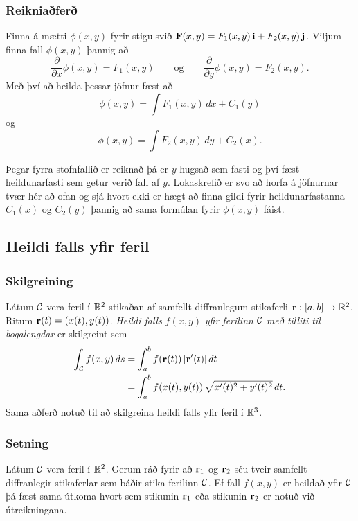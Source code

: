 \subsubsection{Reikniaðferð }
 Finna á mætti $\phi(x,y)$ fyrir stigulsvið  $\mbox{${\bf F}$}(x,y)=F_1(x,y)\,\mbox{${\bf i}$}+F_2(x,y)\,\mbox{${\bf j}$}$.  Viljum finna fall $\phi(x,y)$ þannig að 
$$\frac{\partial}{\partial x}\phi(x,y)=F_1(x,y)\qquad
\mbox{og}\qquad \frac{\partial}{\partial y}\phi(x,y)=F_2(x,y).$$
 Með því að heilda þessar jöfnur fæst að 
 $$\phi(x,y)=\int F_1(x,y)\,dx+C_1(y)$$
og
$$\phi(x,y)=\int F_2(x,y)\,dy+C_2(x).$$

Þegar fyrra stofnfallið er reiknað þá er $y$ hugsað sem fasti og því fæst heildunarfasti sem getur verið fall af $y$.  Lokaskrefið er  svo að horfa á jöfnurnar tvær hér að ofan og sjá hvort ekki er hægt að finna gildi fyrir heildunarfastanna $C_1(x)$ og $C_2(y)$ þannig að sama formúlan fyrir $\phi(x,y)$ fáist.  



\subsection{Heildi falls yfir feril} 

\subsubsection{Skilgreining }
Látum $\cal C$ vera feril í ${\mathbb R}^2$ stikaðan af samfellt diffranlegum stikaferli $\mbox{${\bf r}$}:[a,b]\rightarrow{\mathbb R}^2$.  Ritum $\mbox{${\bf r}$}(t)=(x(t),y(t))$.  {\em Heildi falls} $f(x,y)$ {\em yfir ferilinn} $\cal C$ {\em með tilliti til bogalengdar} er skilgreint sem 
\begin{align*}  
\int_{\cal C}f(x,y)\,ds&=\int_a^b f(\mbox{${\bf r}$}(t))\,|\mbox{${\bf r}$}'(t)|\,dt\\
&=\int_a^b f(x(t),y(t))\,\sqrt{x'(t)^2+y'(t)^2}\,dt.\end{align*}
Sama aðferð notuð til að skilgreina heildi falls yfir feril í ${\mathbb R}^3$.



\subsubsection{Setning }
 Látum $\cal C$ vera feril í ${\mathbb R}^2$.  Gerum ráð fyrir að $\mbox{${\bf r}$}_1$ og $\mbox{${\bf r}$}_2$ séu tveir samfellt diffranlegir stikaferlar sem báðir stika ferilinn $\cal C$.  Ef fall $f(x,y)$ er heildað yfir $\cal C$ þá fæst sama útkoma hvort sem stikunin $\mbox{${\bf r}$}_1$ eða stikunin $\mbox{${\bf r}$}_2$ er notuð við útreikningana.





